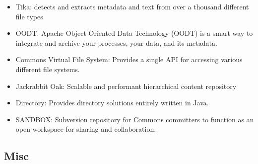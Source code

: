 \documentclass[12pt]{report}
\providecommand{\tightlist}{%
  \setlength{\itemsep}{0pt}\setlength{\parskip}{0pt}}
\begin{document}
\begin{itemize}
\tightlist
\item
  Tika: detects and extracts metadata and text from over a thousand
  different file types
\item
  OODT: Apache Object Oriented Data Technology (OODT) is a smart way to
  integrate and archive your processes, your data, and its metadata.
\item
  Commons Virtual File System: Provides a single API for accessing
  various different file systems.
\item
  Jackrabbit Oak: Scalable and performant hierarchical content
  repository
\item
  Directory: Provides directory solutions entirely written in Java.
\item
  SANDBOX: Subversion repository for Commons committers to function as
  an open workspace for sharing and collaboration.
\end{itemize}

\subsection{Misc}\label{misc}
\end{document}
